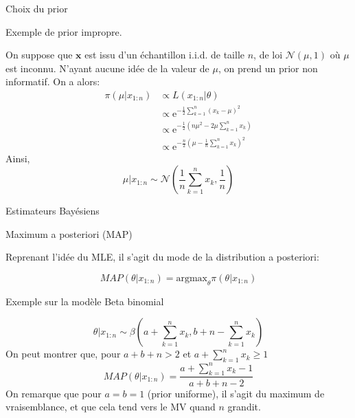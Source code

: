 \documentclass[9pt,ignorenonframetext,]{beamer}
\begin{document}
\begin{frame}{Choix du prior}
\protect\hypertarget{choix-du-prior-1}{}

\begin{block}{Exemple de prior impropre.}

On suppose que \(\mathbf{x}\) est issu d'un échantillon i.i.d. de taille
\(n\), de loi \(\mathcal{N}(\mu, 1)\) où \(\mu\) est inconnu. N'ayant
aucune idée de la valeur de \(\mu\), on prend un prior non informatif.
On a alors: \begin{align*}
\pi(\mu \vert x_{1:n}) &\propto L(x_{1:n} \vert \theta)\\
&\propto \text{e}^{-\frac{1}{2}\sum_{k = 1}^n (x_k - \mu)^2}\\
&\propto\text{e}^{-\frac{1}{2}(n \mu^2 - 2\mu\sum_{k = 1}^n x_k)}\\
&\propto\text{e}^{-\frac{n}{2}(\mu - \frac{1}{n}\sum_{k = 1}^n x_k)^2}
\end{align*} Ainsi,
\[\mu\vert x_{1:n} \sim \mathcal{N}\left(\frac{1}{n}\sum_{k = 1}^n x_k, \frac{1}{n}\right)\]

\end{block}

\end{frame}

\begin{frame}{Estimateurs Bayésiens}
\protect\hypertarget{estimateurs-bayuxe9siens}{}

\begin{block}{Maximum a posteriori (MAP)}

Reprenant l'idée du MLE, il s'agit du mode de la distribution a
posteriori:

\[MAP(\theta \vert x_{1:n}) = \text{argmax}_\theta \pi(\theta \vert x_{1:n})\]
\pause

\end{block}

\begin{block}{Exemple sur la modèle Beta binomial}

\[\theta\vert x_{1:n} \sim \beta\left(a + \sum_{k = 1}^n x_k, b + n - \sum_{k = 1}^n x_k\right)\]
On peut montrer que, pour \(a + b + n > 2\) et
\(a + \sum_{k = 1}^n x_k \geq 1\)
\[MAP(\theta \vert x_{1:n}) = \frac{a + \sum_{k = 1}^n x_k-1}{a  +  b + n -2}\]
\pause On remarque que pour \(a = b = 1\) (prior uniforme), il s'agit du
maximum de vraisemblance, et que cela tend vers le MV quand \(n\)
grandit.

\end{block}

\end{frame}
\end{document}
